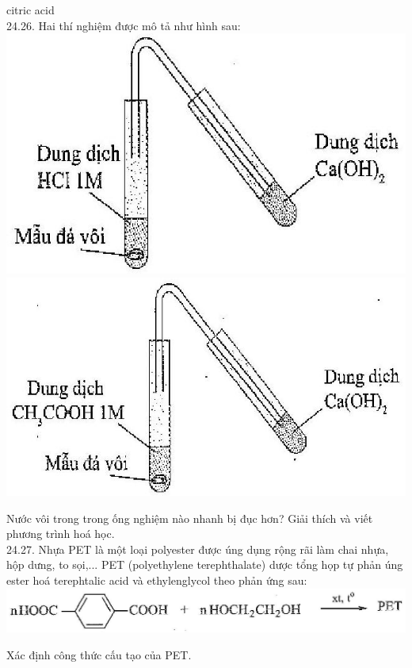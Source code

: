 \documentclass[10pt]{article}
\begin{document}
citric acid\\
24.26. Hai thí nghiệm được mô tả như hình sau:\\
\includegraphics[max width=\textwidth, center]{2025_10_23_fa9073eecee116ad8cf2g-86(1)}\\
\includegraphics[max width=\textwidth, center]{2025_10_23_fa9073eecee116ad8cf2g-86}

Nước vôi trong trong ống nghiệm nào nhanh bị đục hơn? Giải thích và viết phương trình hoá học.\\
24.27. Nhựa PET là một loại polyester được úng dụng rộng rãi làm chai nhựa, hộp dưng, to sọi,... PET (polyethylene terephthalate) dược tổng họp tự phản úng ester hoá terephtalic acid và ethylenglycol theo phản ứng sau:\\
\includegraphics[max width=\textwidth, center]{2025_10_23_fa9073eecee116ad8cf2g-86(2)}

Xác định công thức cấu tạo của PET.
\end{document}
